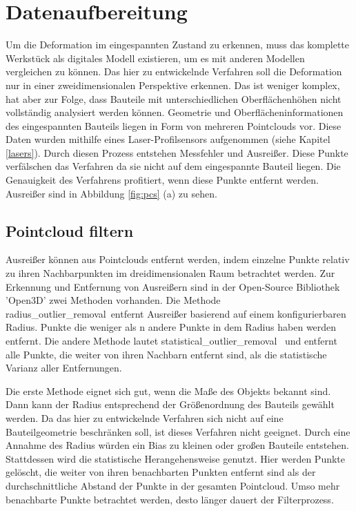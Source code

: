 

\chapter{Datenaufbereitung} \label{prepareData}

Um die Deformation im eingespannten Zustand zu erkennen, muss das komplette Werkstück
als digitales Modell existieren, um es mit anderen Modellen vergleichen zu können.
Das hier zu entwickelnde Verfahren soll die Deformation nur in einer zweidimensionalen Perspektive erkennen. 
Das ist weniger komplex, hat aber zur Folge, dass Bauteile mit unterschiedlichen 
Oberflächenhöhen nicht vollständig analysiert werden können. 
Geometrie und Oberflächeninformationen des eingespannten Bauteils liegen 
in Form von mehreren Pointclouds vor.
Diese Daten wurden mithilfe eines Laser-Profilsensors aufgenommen 
(siehe Kapitel \ref{lasers}). Durch diesen Prozess 
entstehen Messfehler und Ausreißer. Diese Punkte verfälschen das Verfahren da sie 
nicht auf dem eingespannte Bauteil liegen. Die Genauigkeit des Verfahrens profitiert, 
wenn diese Punkte entfernt werden. Ausreißer sind in Abbildung \ref{fig:pcs} (a) 
zu sehen.

\section{Pointcloud filtern}
    
Ausreißer können aus Pointclouds entfernt werden, indem einzelne Punkte 
relativ zu ihren Nachbarpunkten im dreidimensionalen Raum betrachtet werden.
Zur Erkennung und Entfernung von Ausreißern sind in der Open-Source
Bibliothek 'Open3D' zwei Methoden vorhanden. 
Die Methode \glqq radius\_outlier\_removal\grqq~entfernt Ausreißer basierend auf 
einem konfigurierbaren Radius. Punkte die weniger als n andere Punkte in dem Radius 
haben werden entfernt. Die andere Methode lautet 
\glqq statistical\_outlier\_removal\grqq~ 
und entfernt alle Punkte, die weiter von ihren Nachbarn entfernt sind, als die 
statistische Varianz aller Entfernungen. \cite{Zhou.30012018}

Die erste Methode eignet sich gut, wenn die Maße des Objekts bekannt
sind. Dann kann der Radius entsprechend der Größenordnung des Bauteils gewählt werden.
Da das hier zu entwickelnde Verfahren sich nicht auf eine Bauteilgeometrie 
beschränken soll, ist dieses Verfahren nicht geeignet. 
Durch eine Annahme des Radius würden ein Bias 
zu kleinen oder großen Bauteile entstehen.
Stattdessen wird die statistische Herangehensweise genutzt. 
Hier werden Punkte gelöscht, die weiter von ihren benachbarten Punkten entfernt
sind als der durchschnittliche Abstand der Punkte in der gesamten Pointcloud. 
Umso mehr benachbarte Punkte betrachtet werden, desto länger dauert der Filterprozess.

